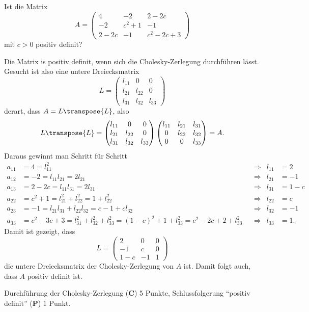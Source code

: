 Ist die Matrix
\[
A=
\begin{pmatrix}
4&-2&2-2c\\
-2&c^2+1&-1\\
2-2c&-1&c^2-2c+3
\end{pmatrix}
\]
mit $c>0$ positiv definit?

\begin{loesung}
Die Matrix is positiv definit, wenn sich die Cholesky-Zerlegung durchführen
lässt.
Gesucht ist also eine untere Dreiecksmatrix
\[
L=
\begin{pmatrix}
l_{11}&     0&     0\\
l_{21}&l_{22}&     0\\
l_{31}&l_{32}&l_{33}
\end{pmatrix}
\]
derart, dass $A=L\transpose{L}$, also
\[
L\transpose{L}
=
\begin{pmatrix}
l_{11}&     0&     0\\
l_{21}&l_{22}&     0\\
l_{31}&l_{32}&l_{33}
\end{pmatrix}
\begin{pmatrix}
l_{11}&l_{21}&l_{31}\\
     0&l_{22}&l_{32}\\
     0&     0&l_{33}
\end{pmatrix}
=
A.
\]
Daraus gewinnt man Schritt für Schritt
\begin{align*}
a_{11}
&=
4
=
l_{11}^2
&&\Rightarrow& l_{11} &= 2
\\
a_{12}
&=
-2
=
l_{11}l_{21}
=
2l_{21}
&&\Rightarrow& l_{21} &= -1
\\
a_{13}
&=
2-2c
=
l_{11}l_{31}
=2l_{31}
&&\Rightarrow& l_{31} &=1-c
\\
a_{22}
&=
c^2+1
=
l_{21}^2 + l_{22}^2 = 1 + l_{22}^2
&&\Rightarrow& l_{22} &= c
\\
a_{23}
&=
-1
=
l_{21}l_{31}+l_{22}l_{32}
=
c-1+cl_{32}
&&\Rightarrow& l_{32} &= -1
\\
a_{33}
&=
c^2-3c+3
=
l_{31}^2+l_{32}^2+l_{33}^2
=
(1-c)^2+1+l_{33}^2
=
c^2-2c+2+l_{33}^2
&&\Rightarrow& l_{33} &= 1.
\end{align*}
Damit ist gezeigt, dass
\[
L=\begin{pmatrix}
2&0&0\\
-1&c&0\\
1-c&-1&1
\end{pmatrix}
\]
die untere Dreiecksmatrix der Cholesky-Zerlegung von $A$ ist.
Damit folgt auch, dass $A$ positiv definit ist.
\end{loesung}

\begin{bewertung}
Durchführung der Cholesky-Zerlegung ({\bf C}) 5 Punkte,
Schlussfolgerung ``positiv definit'' ({\bf P}) 1 Punkt.
\end{bewertung}

